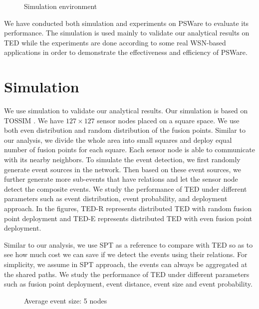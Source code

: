 \begin{figure}
\centering
{}
\caption{Simulation environment}
\label{fig:simsetup}
\end{figure}

We have conducted both simulation and experiments on PSWare to evaluate its performance. The simulation is used mainly to validate our analytical results on TED while the experiments are done according to some real WSN-based applications in order to demonstrate the effectiveness and efficiency of PSWare.

\section{Simulation}
\label{sec:simulation}
We use simulation to validate our analytical results. Our simulation is based on TOSSIM \cite{tossim}. We have \(127\times 127\) sensor nodes placed on a square space. We use both even distribution and random distribution of the fusion points. Similar to our analysis, we divide the whole area into small squares and deploy equal number of fusion points for each square. Each sensor node is able to communicate with its nearby neighbors. To simulate the event detection, we first randomly generate event sources in the network. Then based on these event sources, we further generate more sub-events that have relations and let the sensor node detect the composite events. We study the performance of TED under different parameters such as event distribution, event probability, and deployment approach. In the figures, TED-R represents distributed TED with random fusion point deployment and TED-E represents distributed TED with even fusion point deployment.

Similar to our analysis, we use SPT as a reference to compare with TED so as to see how much cost we can save if we detect the events using their relations. For simplicity, we assume in SPT approach, the events can always be aggregated at the shared paths. We study the performance of TED under different parameters such as fusion point deployment, event distance, event size and event probability.

\begin{figure}
\centering
{}
\caption{Average event size: 5 nodes}
\label{fig:sim-distance-size5}
\end{figure}


